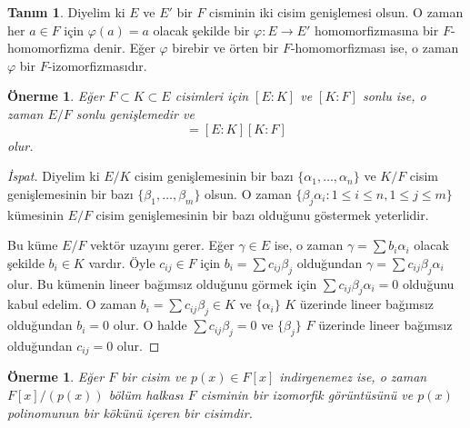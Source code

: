 \documentclass[draft]{article}
\newtheorem{prop}[thm]{Önerme}
\theoremstyle{definition}
\newtheorem{defn}{Tanım}[section]
\theoremstyle{remark}
\begin{document}
			\begin{defn}
			    Diyelim ki $E$ ve $E'$ bir $F$ cisminin iki cisim genişlemesi olsun. O zaman her $a \in F$ için $\varphi(a) = a$ olacak şekilde bir $\varphi:  E \to E'$ homomorfizmasına bir $F$-homomorfizma denir. Eğer $\varphi$ birebir ve örten bir $F$-homomorfizması ise, o zaman $\varphi$ bir $F$-izomorfizmasıdır.
			\end{defn}
			
			\begin{prop}
				Eğer $F \subset K \subset E$ cisimleri için $[E : K]$ ve $[K : F]$ sonlu ise, o zaman $E/F$ sonlu genişlemedir ve
				\begin{equation*}
					[E : F] = [E : K][K : F]
				\end{equation*}
				olur.
			\end{prop}
			
			\begin{proof}[İspat]
			    Diyelim ki $E/K$ cisim genişlemesinin bir bazı $\{\alpha_1, \dots, \alpha_n\}$ ve $K/F$ cisim genişlemesinin bir bazı $\{\beta_1, \dots, \beta_m\}$ olsun. O zaman $\{\beta_j\alpha_i : 1 \leq i \leq n, 1 \leq j \leq m\}$ kümesinin $E/F$ cisim genişlemesinin bir bazı olduğunu göstermek yeterlidir.\par
			    Bu küme $E/F$ vektör uzayını gerer. Eğer $\gamma \in E$ ise, o zaman $\gamma = \sum{b_i\alpha_i}$ olacak şekilde $b_i \in K$ vardır. Öyle $c_{ij} \in F$ için $b_i = \sum{c_{ij}\beta_j}$ olduğundan $\gamma = \sum{c_{ij}\beta_j\alpha_i}$ olur. Bu kümenin lineer bağımsız olduğunu görmek için $\sum{c_{ij}\beta_j\alpha_i} = 0$ olduğunu kabul edelim. O zaman $b_i = \sum{c_{ij}\beta_j} \in K$ ve $\{\alpha_i\}$ $K$ üzerinde lineer bağımsız olduğundan $b_i = 0$ olur. O halde $\sum{c_{ij}\beta_j} = 0$ ve $\{\beta_j\}$ $F$ üzerinde lineer bağımsız olduğundan $c_{ij} = 0$ olur.
			\end{proof}
			
			\begin{prop}
			    Eğer $F$ bir cisim ve $p(x) \in F[x]$ indirgenemez ise, o zaman $F[x]/(p(x))$ bölüm halkası $F$ cisminin bir izomorfik görüntüsünü ve $p(x)$ polinomunun bir kökünü içeren bir cisimdir.
			\end{prop}
			
\end{document}
